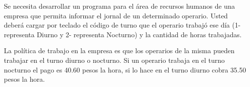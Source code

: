 Se necesita desarrollar un programa para el área de recursos humanos de una empresa que permita informar el jornal de un determinado operario. Usted deberá cargar por teclado el código de turno que el operario trabajó ese día (1- representa Diurno y 2- representa Nocturno) y la cantidad de horas trabajadas.

La política de trabajo en la empresa es que los operarios de la misma pueden trabajar en el turno diurno o nocturno. Si un operario trabaja en el turno nocturno el pago es 40.60 pesos la hora, si lo hace en el turno diurno cobra 35.50 pesos la hora.